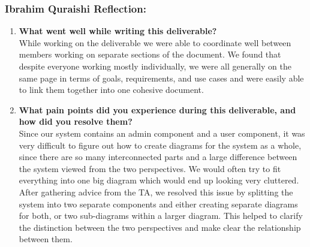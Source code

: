 \subsubsection*{Ibrahim Quraishi Reflection:}
\begin{enumerate}
  \item \textbf{What went well while writing this deliverable?} \\
  While working on the deliverable we were able to coordinate well between members working on separate sections of the document. We found that despite everyone working mostly individually, we were all generally on the same page in terms of goals, requirements, and use cases and were easily able to link them together into one cohesive document. 

  \item \textbf{What pain points did you experience during this deliverable, and how did you resolve them?} \\
  Since our system contains an admin component and a user component, it was very difficult to figure out how to create diagrams for the system as a whole, since there are so many interconnected parts and a large difference between the system viewed from the two perspectives. We would often try to fit everything into one big diagram which would end up looking very cluttered. After gathering advice from the TA, we resolved this issue by splitting the system into two separate components and either creating separate diagrams for both, or two sub-diagrams within a larger diagram. This helped to clarify the distinction between the two perspectives and make clear the relationship between them.
\end{enumerate}





